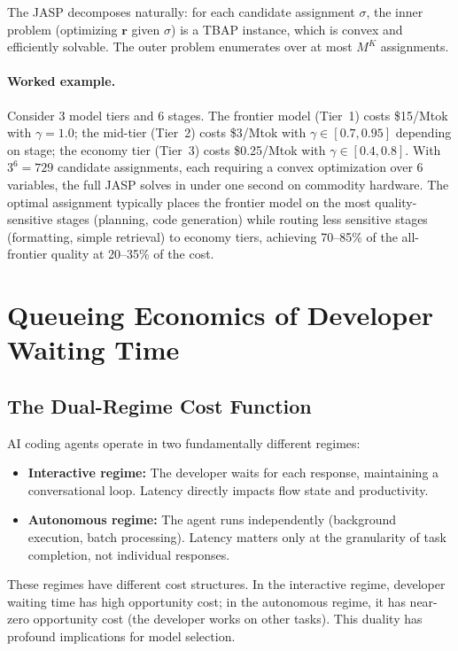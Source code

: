\documentclass[11pt, a4paper, logo, copyright]{googledeepmind}
\begin{document}
The JASP decomposes naturally: for each candidate assignment $\sigma$, the inner problem (optimizing $\mathbf{r}$ given $\sigma$) is a TBAP instance, which is convex and efficiently solvable. The outer problem enumerates over at most $M^K$ assignments.

\paragraph{Worked example.}
Consider 3 model tiers and 6 stages. The frontier model (Tier~1) costs \$15/Mtok with $\gamma = 1.0$; the mid-tier (Tier~2) costs \$3/Mtok with $\gamma \in [0.7, 0.95]$ depending on stage; the economy tier (Tier~3) costs \$0.25/Mtok with $\gamma \in [0.4, 0.8]$. With $3^6 = 729$ candidate assignments, each requiring a convex optimization over 6 variables, the full JASP solves in under one second on commodity hardware. The optimal assignment typically places the frontier model on the most quality-sensitive stages (planning, code generation) while routing less sensitive stages (formatting, simple retrieval) to economy tiers, achieving 70--85\% of the all-frontier quality at 20--35\% of the cost.


\section{Queueing Economics of Developer Waiting Time}\label{sec:queueing}

\subsection{The Dual-Regime Cost Function}

AI coding agents operate in two fundamentally different regimes:
\begin{itemize}[nosep]
    \item \textbf{Interactive regime:} The developer waits for each response, maintaining a conversational loop. Latency directly impacts flow state and productivity.
    \item \textbf{Autonomous regime:} The agent runs independently (background execution, batch processing). Latency matters only at the granularity of task completion, not individual responses.
\end{itemize}

These regimes have different cost structures. In the interactive regime, developer waiting time has high opportunity cost; in the autonomous regime, it has near-zero opportunity cost (the developer works on other tasks). This duality has profound implications for model selection.
\end{document}
